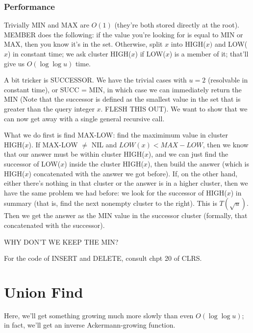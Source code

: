 \documentclass{article}
\begin{document}
\subsubsection{Performance}

Trivially MIN and MAX are $O(1)$ (they're both stored directly at the root).
MEMBER does the following: if the value you're looking for is equal to
MIN or MAX, then you know it's in the set.
Otherwise, split $x$ into HIGH($x)$ and LOW($x$) in constant time; we ask
cluster HIGH($x$) if LOW($x$) is a member of it; that'll give us
$O(\log\log u)$ time.

A bit tricker is SUCCESSOR.
We have the trivial cases with $u=2$ (resolvable in constant time), or
SUCC = MIN,
in which case we can immediately return the MIN (Note that the successor
is defined as the smallest value in the set that is greater than the
query integer $x$. FLESH THIS OUT).
We want to show that we can now get away with a single general recursive
call.

What we do first is find MAX-LOW: find the maximimum value in
cluster HIGH($x$).
If MAX-LOW $\neq$ NIL and $LOW(x) < MAX-LOW$, then we know that our answer
must be within cluster HIGH($x$), and we can just find the successor
of LOW($x$) inside the cluster HIGH($x$), then build the answer (which is
HIGH($x$) concatenated with the answer we got before).
If, on the other hand, either there's nothing in that cluster or the answer
is in a higher cluster, then we have the same problem we had
before: we look for the successor of HIGH($x$) in summary (that is, find the
next nonempty cluster to the right). This is $T(\sqrt u)$.
Then we get the answer as the MIN value in the successor cluster (formally,
that concatenated with the successor).

WHY DON'T WE KEEP THE MIN?


For the code of INSERT and DELETE, consult chpt 20 of CLRS.



\section{Union Find}

Here, we'll get something growing much more slowly than even $O(\log\log u)$;
in fact, we'll get an inverse Ackermann-growing function.
\end{document}
